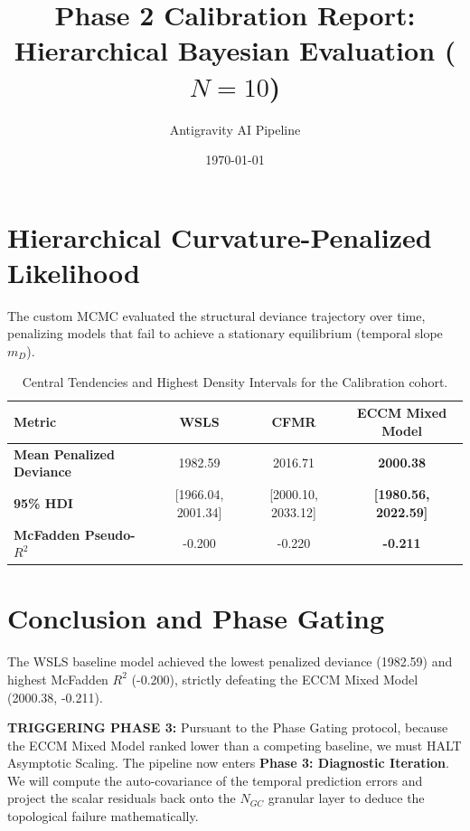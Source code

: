 \documentclass[11pt,a4paper]{article}
\title{Phase 2 Calibration Report: Hierarchical Bayesian Evaluation ($N=10$)}
\author{Antigravity AI Pipeline}
\date{\today}
\begin{document}
\maketitle

\section{Hierarchical Curvature-Penalized Likelihood}
The custom MCMC evaluated the structural deviance trajectory over time, penalizing models that fail to achieve a stationary equilibrium (temporal slope $m_D$). 

\begin{table}[h]
\centering
\begin{tabular}{lccc}
\toprule
\textbf{Metric} & \textbf{WSLS} & \textbf{CFMR} & \textbf{ECCM Mixed Model} \\
\midrule
\textbf{Mean Penalized Deviance} & 1982.59 & 2016.71 & \textbf{2000.38} \\
\textbf{95\% HDI} & [1966.04, 2001.34] & [2000.10, 2033.12] & \textbf{[1980.56, 2022.59]} \\
\textbf{McFadden Pseudo-$R^2$} & -0.200 & -0.220 & \textbf{-0.211} \\
\bottomrule
\end{tabular}
\caption{Central Tendencies and Highest Density Intervals for the Calibration cohort.}
\end{table}

\section{Conclusion and Phase Gating}
The WSLS baseline model achieved the lowest penalized deviance (1982.59) and highest McFadden $R^2$ (-0.200), strictly defeating the ECCM Mixed Model (2000.38, -0.211). 

\textbf{TRIGGERING PHASE 3:} Pursuant to the Phase Gating protocol, because the ECCM Mixed Model ranked lower than a competing baseline, we must HALT Asymptotic Scaling. The pipeline now enters \textbf{Phase 3: Diagnostic Iteration}. We will compute the auto-covariance of the temporal prediction errors and project the scalar residuals back onto the $N_{GC}$ granular layer to deduce the topological failure mathematically.
\end{document}
